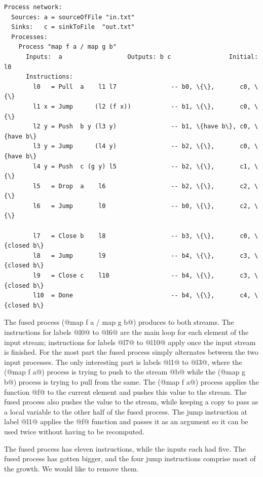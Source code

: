 \begin{lstlisting}[linebackgroundcolor={
  \hilineFst{8}
  \hilineCom{9}
  \hilineFst{10}
  \hilineSnd{11}
  \hilineSnd{12}
  \hilineFst{13}
  \hilineSnd{14}
  \hilineFst{16}
  \hilineSnd{17}
  \hilineSnd{18}
  \hilineCom{19}
}]
Process network:
  Sources: a = sourceOfFile "in.txt"
  Sinks:   c = sinkToFile  "out.txt"
  Processes:
    Process "map f a / map g b"
      Inputs:  a                  Outputs: b c                Initial: l0
      Instructions:
        l0   = Pull  a    l1 l7               -- b0, \{\},       c0, \{\}
        l1 x = Jump      (l2 (f x))           -- b1, \{\},       c0, \{\}
        l2 y = Push  b y (l3 y)               -- b1, \{have b\}, c0, \{have b\}
        l3 y = Jump      (l4 y)               -- b2, \{\},       c0, \{have b\}
        l4 y = Push  c (g y) l5               -- b2, \{\},       c1, \{\}
        l5   = Drop  a    l6                  -- b2, \{\},       c2, \{\}
        l6   = Jump       l0                  -- b0, \{\},       c2, \{\}

        l7   = Close b    l8                  -- b3, \{\},       c0, \{closed b\}
        l8   = Jump       l9                  -- b4, \{\},       c3, \{closed b\}
        l9   = Close c    l10                 -- b4, \{\},       c3, \{closed b\}
        l10  = Done                           -- b4, \{\},       c4, \{closed b\}
\end{lstlisting}

The fused process (@map f a / map g b@) produces to both streams.
The instructions for labels @l0@ to @l6@ are the main loop for each element of the input stream; instructions for labels @l7@ to @l10@ apply once the input stream is finished.
For the most part the fused process simply alternates between the two input processes.
The only interesting part is labels @l1@ to @l3@, where the (@map f a@) process is trying to push to the stream @b@ while the (@map g b@) process is trying to pull from the same.
The (@map f a@) process applies the function @f@ to the current element and pushes this value to the stream.
The fused process also pushes the value to the stream, while keeping a copy to pass as a local variable to the other half of the fused process.
The jump instruction at label @l1@ applies the @f@ function and passes it as an argument so it can be used twice without having to be recomputed.

The fused process has eleven instructions, while the inputs each had five.
The fused process has gotten bigger, and the four jump instructions comprise most of the growth.
We would like to remove them.

